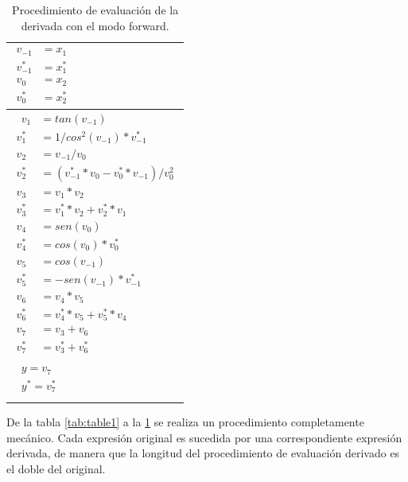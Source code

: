 \begin{table}[htp]
		\begin{center}
			\begin{tabular}{|l|} \hline
			$\begin{aligned}
			
			v_{-1}&=x_{1}     \\
			v_{-1}^{*}&=x_{1}^{*}	   \\
			v_{0}&=x_{2} 	   \\ 
			v_{0}^{*}&=x_{2}^{*}
			\end{aligned}$
			\\ \hline
			$\begin{aligned}
			\ \ v_{1}&=tan(v_{-1})   \\
			v_{1}^{*}&=1/cos^{2}(v_{-1})*v_{-1}^{*} \\
			v_{2}&=v_{-1}/v_{0}  \\
			v_{2}^{*}&=(v_{-1}^{*}*v_{0}-v_{0}^{*}*v_{-1})/v_{0}^{2} \\
			v_{3}&=v_{1}*v_{2}   \\
			v_{3}^{*}&=v_{1}^{*}*v_{2}+v_{2}^{*}*v_{1} \\
			v_{4}&=sen(v_{0})   \\
			v_{4}^{*}&=cos(v_{0})*v_{0}^{*}   \\
			v_{5}&=cos(v_{-1}) \\
			v_{5}^{*}&=-sen(v_{-1})*v_{-1}^{*} \\
			v_{6}&=v_{4}*v_{5} \\
			v_{6}^{*}&=v_{4}^{*}*v_{5}+v_{5}^{*}*v_{4} \\
			v_{7}&=v_{3}+v_{6} \\
			v_{7}^{*}&=v_{3}^{*}+v_{6}^{*} \\
			\end{aligned}$	
			\\ \hline
			$\begin{aligned}
			\ \ y = v_{7} \\
			\ \ y^{*} = v_{7}^{*} \\
			\end{aligned}$		
			\\ \hline
			\end{tabular}
		\caption {Procedimiento de evaluación de la derivada con el modo forward.} 
		\label{tab:table2}
		\end{center}
\end{table}

De la tabla \ref{tab:table1} a la \ref{tab:table2} se realiza un procedimiento completamente mecánico. Cada expresión original es sucedida por una correspondiente expresión derivada, de manera que la longitud del procedimiento de evaluación derivado es el doble del original.

